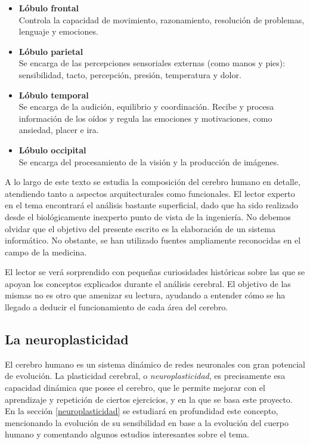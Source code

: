 \begin{itemize}
\item {\bf Lóbulo frontal}\\
Controla la capacidad de movimiento, razonamiento, resolución de problemas, lenguaje y emociones.
\item {\bf Lóbulo parietal}\\
Se encarga de las percepciones sensoriales externas (como manos y pies): sensibilidad, tacto, percepción, presión, temperatura y dolor.
\item {\bf Lóbulo temporal}\\
Se encarga de la audición, equilibrio y coordinación. Recibe y procesa información de los oídos y regula las emociones y motivaciones, como ansiedad, placer e ira.
\item {\bf Lóbulo occipital}\\
Se encarga del procesamiento de la visión y la producción de imágenes.
\end{itemize}

A lo largo de este texto se estudia la composición del cerebro humano en detalle, atendiendo tanto a aspectos arquitecturales como funcionales. El lector experto en el tema encontrará el análisis bastante superficial, dado que ha sido realizado desde el biológicamente inexperto punto de vista de la ingeniería. No debemos olvidar que el objetivo del presente escrito es la elaboración de un sistema informático. No obstante, se han utilizado fuentes ampliamente reconocidas en el campo de la medicina.

El lector se verá sorprendido con pequeñas curiosidades históricas sobre las que se apoyan los conceptos explicados durante el análisis cerebral. El objetivo de las mismas no es otro que amenizar su lectura, ayudando a entender cómo se ha llegado a deducir el funcionamiento de cada área del cerebro.

\subsection{La neuroplasticidad}
\label{sec::neuroplasticidad}

El cerebro humano es un sistema dinámico de redes neuronales con gran potencial de evolución. La plasticidad cerebral, o {\it neuroplasticidad}, es precisamente esa capacidad dinámica que posee el cerebro, que le permite mejorar con el aprendizaje y repetición de ciertos ejercicios, y en la que se basa este proyecto. En la sección \ref{neuroplasticidad} se estudiará en profundidad este concepto, mencionando la evolución de su sensibilidad en base a la evolución del cuerpo humano y comentando algunos estudios interesantes sobre el tema.

